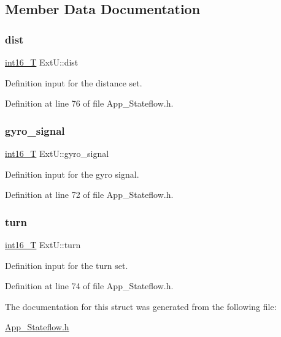 \subsection{Member Data Documentation}
\mbox{\label{struct_ext_u_a6c69fa6ebe22e9a073888b6b9dce877d}} 
\subsubsection{\texorpdfstring{dist}{dist}}
{\footnotesize\ttfamily \mbox{\hyperlink{_app___stateflowtypes_8h_ad73c6af88bb2ce70799e51f639309f21}{int16\+\_\+T}} Ext\+U\+::dist}



Definition input for the distance set. 



Definition at line 76 of file App\+\_\+\+Stateflow.\+h.

\mbox{\label{struct_ext_u_a6c0a282afef47d6b37f84bc45769e69d}} 
\subsubsection{\texorpdfstring{gyro\_signal}{gyro\_signal}}
{\footnotesize\ttfamily \mbox{\hyperlink{_app___stateflowtypes_8h_ad73c6af88bb2ce70799e51f639309f21}{int16\+\_\+T}} Ext\+U\+::gyro\+\_\+signal}



Definition input for the gyro signal. 



Definition at line 72 of file App\+\_\+\+Stateflow.\+h.

\mbox{\label{struct_ext_u_a70e9fe496991f7c0e1fe8f54c5bf4c97}} 
\subsubsection{\texorpdfstring{turn}{turn}}
{\footnotesize\ttfamily \mbox{\hyperlink{_app___stateflowtypes_8h_ad73c6af88bb2ce70799e51f639309f21}{int16\+\_\+T}} Ext\+U\+::turn}



Definition input for the turn set. 



Definition at line 74 of file App\+\_\+\+Stateflow.\+h.



The documentation for this struct was generated from the following file\+:\begin{DoxyCompactItemize}
\item 
\mbox{\hyperlink{_app___stateflow_8h}{App\+\_\+\+Stateflow.\+h}}\end{DoxyCompactItemize}
